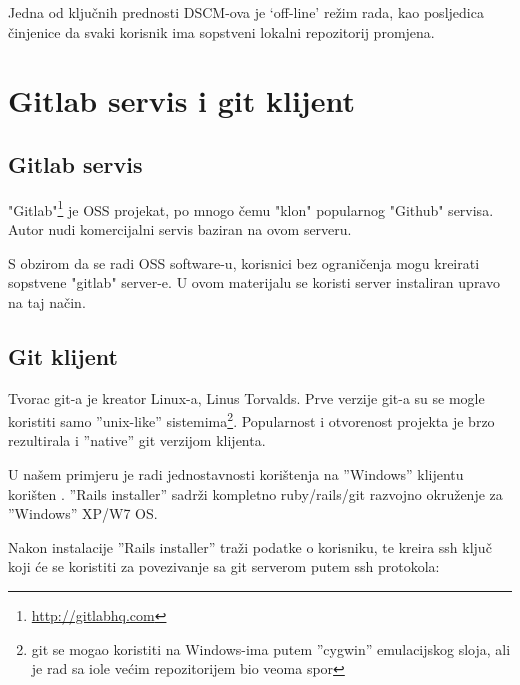 \documentclass[times, utf8, seminar]{fit}
\begin{document}
Jedna od ključnih prednosti DSCM-ova je `off-line' režim rada, kao posljedica činjenice da svaki korisnik ima sopstveni lokalni repozitorij promjena.

\chapter{Gitlab servis i git klijent}
\vspace*{-0.7cm}

\section{Gitlab servis}

"Gitlab"\footnote{\url{http://gitlabhq.com}} je OSS projekat, po mnogo čemu "klon" popularnog "Github" servisa. 
Autor nudi komercijalni servis \href{https://gitlab.com}{\color{blue}{''gitlab.com''}} baziran na ovom serveru.

S obzirom da se radi OSS software-u, korisnici bez ograničenja mogu kreirati sopstvene "gitlab" server-e.
U ovom materijalu se koristi server \href{https://gitlab.knowhow.out.ba}{\color{blue}{''gitlab.knowhow.out.ba''}} instaliran upravo na taj način.

\section{Git klijent}

Tvorac git-a je kreator Linux-a, Linus Torvalds. Prve verzije git-a su se mogle koristiti samo ''unix-like'' sistemima\footnote{git se mogao koristiti na Windows-ima putem ''cygwin'' emulacijskog sloja, ali je rad sa iole većim repozitorijem bio veoma spor}. 
Popularnost i otvorenost projekta je brzo rezultirala i ''native'' git verzijom klijenta.

U našem primjeru je radi jednostavnosti korištenja na ''Windows'' klijentu korišten \href{http://railsinstaller.org/}{\color{blue}{''Rails installer''}}. 
''Rails installer'' sadrži kompletno ruby/rails/git razvojno okruženje za ''Windows'' XP/W7 OS.

Nakon instalacije ''Rails installer'' traži podatke o korisniku, te kreira ssh ključ koji će se koristiti za povezivanje sa git serverom putem ssh protokola:
\end{document}
